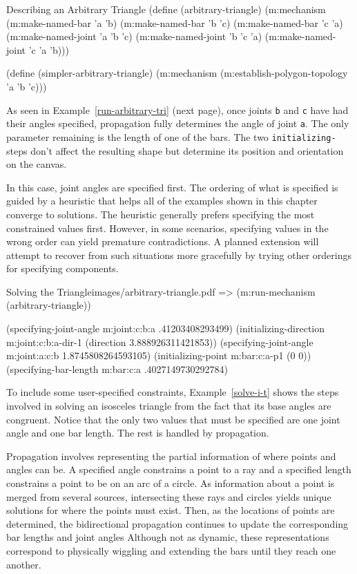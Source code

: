 \begin{code-example}
[label=arbitrary-tri]
{Describing an Arbitrary Triangle}
(define (arbitrary-triangle)
  (m:mechanism
   (m:make-named-bar 'a 'b)
   (m:make-named-bar 'b 'c)
   (m:make-named-bar 'c 'a)
   (m:make-named-joint 'a 'b 'c)
   (m:make-named-joint 'b 'c 'a)
   (m:make-named-joint 'c 'a 'b)))

(define (simpler-arbitrary-triangle)
  (m:mechanism
   (m:establish-polygon-topology 'a 'b 'c)))
\end{code-example}

As seen in Example~\ref{run-arbitrary-tri} (next page), once joints
\texttt{b} and \texttt{c} have had their angles specified, propagation
fully determines the angle of joint \texttt{a}.  The only parameter
remaining is the length of one of the bars.  The two
\texttt{initializing-} steps don't affect the resulting shape but
determine its position and orientation on the canvas.

In this case, joint angles are specified first. The ordering of what
is specified is guided by a heuristic that helps all of the examples
shown in this chapter converge to solutions. The heuristic generally
prefers specifying the most constrained values first. However, in some
scenarios, specifying values in the wrong order can yield premature
contradictions. A planned extension will attempt to recover from such
situations more gracefully by trying other orderings for specifying
components.

\begin{pdf-example}
[label=run-arbitrary-tri]
{Solving the Triangle}{images/arbitrary-triangle.pdf}
=> (m:run-mechanism (arbitrary-triangle))

(specifying-joint-angle m:joint:c:b:a .41203408293499)
(initializing-direction m:joint:c:b:a-dir-1 (direction 3.888926311421853))
(specifying-joint-angle m:joint:a:c:b 1.8745808264593105)
(initializing-point m:bar:c:a-p1 (0 0))
(specifying-bar-length m:bar:c:a .4027149730292784)
\end{pdf-example}

To include some user-specified constraints, Example~\ref{solve-i-t}
shows the steps involved in solving an isosceles triangle from the fact
that its base angles are congruent. Notice that the only two values
that must be specified are one joint angle and one bar length. The
rest is handled by propagation.

Propagation involves representing the partial information of where
points and angles can be. A specified angle constrains a point to a
ray and a specified length constrains a point to be on an arc of a
circle. As information about a point is merged from several sources,
intersecting these rays and circles yields unique solutions for where
the points must exist. Then, as the locations of points are determined,
the bidirectional propagation continues to update the corresponding
bar lengths and joint angles Although not as dynamic, these
representations correspond to physically wiggling and extending the
bars until they reach one another.

